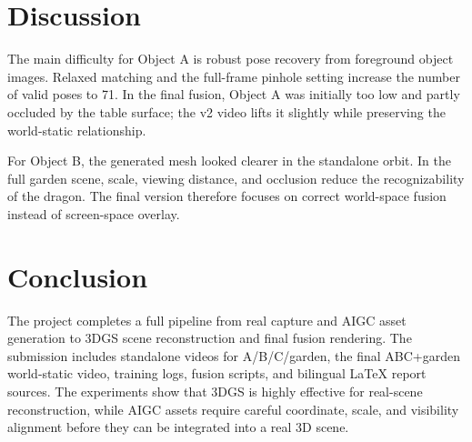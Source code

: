 \documentclass[11pt]{article}
\begin{document}
\section{Discussion}
The main difficulty for Object A is robust pose recovery from foreground object images. Relaxed matching and the full-frame pinhole setting increase the number of valid poses to 71. In the final fusion, Object A was initially too low and partly occluded by the table surface; the v2 video lifts it slightly while preserving the world-static relationship.

For Object B, the generated mesh looked clearer in the standalone orbit. In the full garden scene, scale, viewing distance, and occlusion reduce the recognizability of the dragon. The final version therefore focuses on correct world-space fusion instead of screen-space overlay.

\section{Conclusion}
The project completes a full pipeline from real capture and AIGC asset generation to 3DGS scene reconstruction and final fusion rendering. The submission includes standalone videos for A/B/C/garden, the final ABC+garden world-static video, training logs, fusion scripts, and bilingual LaTeX report sources. The experiments show that 3DGS is highly effective for real-scene reconstruction, while AIGC assets require careful coordinate, scale, and visibility alignment before they can be integrated into a real 3D scene.
\end{document}
